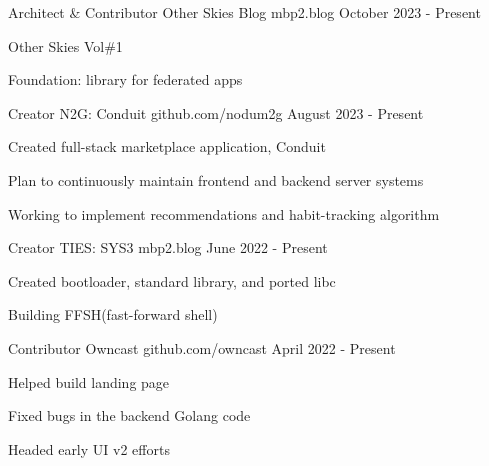 
\begin{cventries}
   \cventry
   {Architect \& Contributor} %
   {Other Skies Blog} %
   {mbp2.blog} %
   {October 2023 - Present} %
   {
      \begin{cvitems} %
         \item {Other Skies Vol\#1}
         \item {Foundation: library for federated apps}
      \end{cvitems}
   }

   \cventry
   {Creator} %
   {N2G: Conduit} %
   {github.com/nodum2g} %
   {August 2023 - Present} %
   {
      \begin{cvitems} %
         \item {Created full-stack marketplace application, Conduit}
         \item {Plan to continuously maintain frontend and backend server systems}
         \item {Working to implement recommendations and habit-tracking algorithm}
      \end{cvitems}
   }

   \cventry
   {Creator} %
   {TIES: SYS3} %
   {mbp2.blog} %
   {June 2022 - Present} %
   {
      \begin{cvitems} %
         \item {Created bootloader, standard library, and ported libc}
         \item {Building FFSH(fast-forward shell)}
      \end{cvitems}
   }

   \cventry
   {Contributor} %
   {Owncast} %
   {github.com/owncast} %
   {April 2022 - Present} %
   {
      \begin{cvitems} %
         \item {Helped build landing page}
         \item {Fixed bugs in the backend Golang code}
         \item {Headed early UI v2 efforts}
      \end{cvitems}
   }


\end{cventries}
